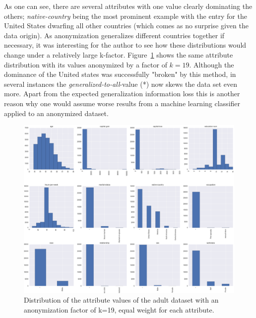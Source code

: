 \documentclass{llncs}
\begin{document}
As one can see, there are several attributes with one value clearly dominating the others; \textit{native-country} being the most prominent example with the entry for the United States dwarfing all other countries (which comes as no surprise given the data origin). As anonymization generalizes different countries together if necessary, it was interesting for the author to see how these distributions would change under a relatively large k-factor. Figure~\ref{fig:adult_anonymized_distribution} shows the same attribute distribution with its values anonymized by a factor of $k=19$. Although the dominance of the United states was successfully "broken" by this method, in several instances the \textit{generalized-to-all}-value (*) now skews the data set even more. Apart from the expected generalization information loss this is another reason why one would assume worse results from a machine learning classifier applied to an anonymized dataset.

\begin{figure}[!t]
	\begin{center}
    	\hspace*{-1cm}
		\includegraphics[width=1.2\textwidth]{figures/experiment/anon_distribution}
		\caption{Distribution of the attribute values of the adult dataset with an anonymization factor of k=19, equal weight for each attribute.}
		\label{fig:adult_anonymized_distribution}
	\end{center}
\end{figure}
\end{document}
